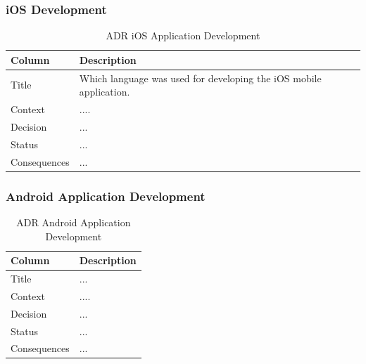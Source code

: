 \documentclass[12pt,a4paper]{article}
\begin{document}
\begin{appendices}
          \subsubsection{iOS Development}
            \begin{table}[H]
              \centering
                \begin{tabularx}{\textwidth}{l X}
                  \hline
                  Column & Description  \\ \hline
                  Title & Which language was used for developing the iOS mobile application. \\ 
                  Context & ....  \\ 
                  Decision & ...  \\ 
                  Status & ... \\ 
                  Consequences & ... \\                  
                  \hline
                \end{tabularx}
                \caption[Table caption text]{ADR iOS Application Development}
                \label{table:ADR iOS Application Development}
            \end{table}

          \subsubsection{Android Application Development}
            \begin{table}[H]
              \centering
                \begin{tabularx}{\textwidth}{l X}
                  \hline
                  Column & Description  \\ \hline
                  Title & ... \\ 
                  Context & ....  \\ 
                  Decision & ...  \\ 
                  Status & ... \\ 
                  Consequences & ... \\                  
                  \hline
                \end{tabularx}
                \caption[Table caption text]{ADR Android Application Development}
                \label{table:ADR Android Application Development}
            \end{table}


\end{appendices}
\end{document}
